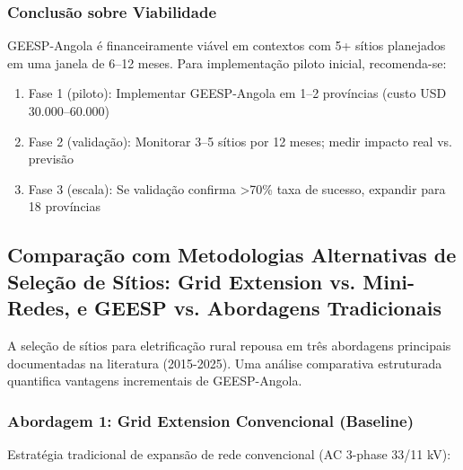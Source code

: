 \documentclass[12pt, a4paper]{article}
\begin{document}
\subsubsection{Conclusão sobre Viabilidade}

GEESP-Angola é financeiramente viável em contextos com 5+ sítios planejados em uma janela de 6--12 meses. Para implementação piloto inicial, recomenda-se:

\begin{enumerate}
\item Fase 1 (piloto): Implementar GEESP-Angola em 1--2 províncias (custo USD 30.000--60.000)
\item Fase 2 (validação): Monitorar 3--5 sítios por 12 meses; medir impacto real vs. previsão
\item Fase 3 (escala): Se validação confirma >70\% taxa de sucesso, expandir para 18 províncias
\end{enumerate}


\subsection{Comparação com Metodologias Alternativas de Seleção de Sítios: Grid Extension vs. Mini-Redes, e GEESP vs. Abordagens Tradicionais}

A seleção de sítios para eletrificação rural repousa em três abordagens principais documentadas na literatura (2015-2025). Uma análise comparativa estruturada quantifica vantagens incrementais de GEESP-Angola.

\subsubsection{Abordagem 1: Grid Extension Convencional (Baseline)}

Estratégia tradicional de expansão de rede convencional (AC 3-phase 33/11 kV):
\end{document}
